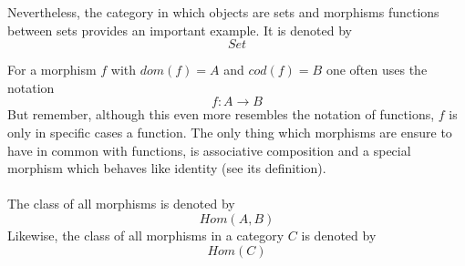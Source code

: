 \documentclass[17pt]{extarticle}
\begin{document}
Nevertheless, the category in which objects are sets and morphisms functions between sets provides an important example. It is denoted by 
$$Set$$

For a morphism $f$ with $dom(f)=A$ and $cod(f)=B$ one often uses the notation
$$
f:A\rightarrow B
$$
But remember, although this even more resembles the notation of functions, $f$ is only in specific
cases a function. The only thing which morphisms are ensure to have in common with functions, is associative composition and a special morphism which behaves like identity (see its definition).\\ \\
The class of all morphisms is denoted by
$$Hom(A,B)$$
Likewise, the class of all morphisms in a category $C$ is denoted by
$$Hom(C)$$
\end{document}

